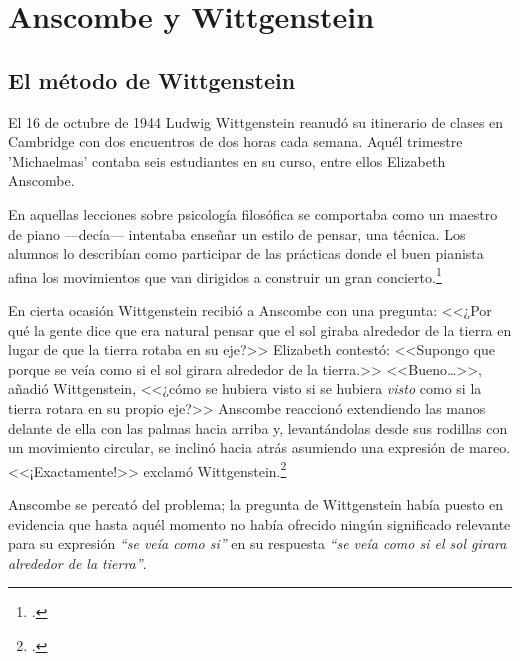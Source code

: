 \section{Anscombe y Wittgenstein}

\subsection{El método de Wittgenstein}
El 16 de octubre de 1944 Ludwig Wittgenstein reanudó su itinerario de clases en
Cambridge con dos encuentros de dos horas cada semana. Aquél trimestre
'Michaelmas' contaba seis estudiantes en su curso, entre ellos Elizabeth
Anscombe. 

En aquellas lecciones sobre psicología filosófica se comportaba como un maestro
de piano ---decía--- intentaba enseñar un estilo de pensar, una técnica. Los
alumnos lo describían como participar de las prácticas donde el buen pianista
afina los movimientos que van dirigidos a construir un gran
concierto.\footcite[p.~357]{pubnpriv}


En cierta ocasión Wittgenstein recibió a Anscombe con una pregunta: <<¿Por qué
la gente dice que era natural pensar que el sol giraba alrededor de la tierra en
lugar de que la tierra rotaba en su eje?>> Elizabeth contestó: <<Supongo que
porque se veía como si el sol girara alrededor de la tierra.>> <<Bueno\ldots>>,
añadió Wittgenstein, <<¿cómo se hubiera visto si se hubiera \emph{visto} como si
la tierra rotara en su propio eje?>> Anscombe reaccionó extendiendo las manos
delante de ella con las palmas hacia arriba y, levantándolas desde sus rodillas
con un movimiento circular, se inclinó hacia atrás asumiendo una expresión de
mareo. <<¡Exactamente!>> exclamó Wittgenstein.\footcite[cf.~][p.~151]{IWT}

Anscombe se percató del problema; la pregunta de Wittgenstein había puesto en
evidencia que hasta aquél momento no había ofrecido ningún significado relevante
para su expresión \emph{``se veía como si''} en su respuesta \emph{``se veía
  como si el sol girara alrededor de la tierra''}.

